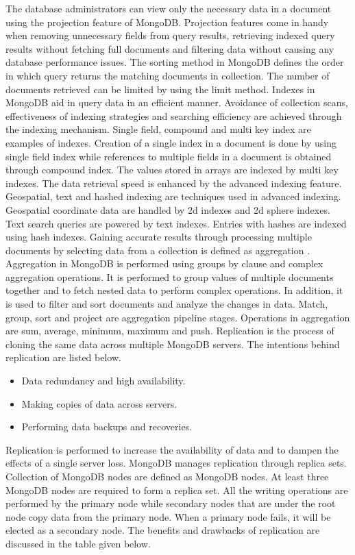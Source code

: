 \documentclass[a4Paper,12pt]{report}
\begin{document}
The database administrators can view only the necessary data in a document using the projection feature of MongoDB. Projection features come in handy when removing unnecessary fields from query results, retrieving indexed query results without fetching full documents and filtering data without causing any database performance issues. The sorting method in MongoDB defines the order in which query returns the matching documents in collection. The number of documents retrieved can be limited by using the limit method. Indexes in MongoDB aid in query data in an efficient manner. Avoidance of collection scans, effectiveness of indexing strategies and searching efficiency are achieved through the indexing mechanism. Single field, compound and multi key index are examples of indexes. Creation of a single index in a document is done by using single field index while references to multiple fields in a document is obtained through compound index. The values stored in arrays are indexed by multi key indexes. The data retrieval speed is enhanced by the advanced indexing feature. Geospatial, text and hashed indexing are techniques used in advanced indexing. Geospatial coordinate data are handled by 2d indexes and 2d sphere indexes. Text search queries are powered by text indexes. Entries with hashes are indexed using hash indexes. Gaining accurate results through processing multiple documents by selecting data from a collection is defined as aggregation \cite{noauthor_undated-pn}. Aggregation in MongoDB is performed using groups by clause and complex aggregation operations. It is performed to group values of multiple documents together and to fetch nested data to perform complex operations. In addition, it is used to filter and sort documents and analyze the changes in data. Match, group, sort and project are aggregation pipeline stages. Operations in aggregation are sum, average, minimum, maximum and push. Replication is the process of cloning the same data across multiple MongoDB servers. The intentions behind replication are listed below.
\begin{itemize}
\item Data redundancy and high availability. 
\item Making copies of data across servers. 
\item Performing data backups and recoveries. 
\end{itemize}
Replication is performed to increase the availability of data and to dampen the effects of a single server loss. MongoDB manages replication through replica sets. Collection of MongoDB nodes are defined as MongoDB nodes. At least three MongoDB nodes are required to form a replica set. All the writing operations are performed by the primary node while secondary nodes that are under the root node copy data from the primary node. When a primary node fails, it will be elected as a secondary node. The benefits and drawbacks of replication are discussed in the table given below.
\end{document}
